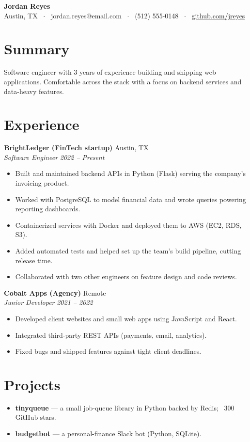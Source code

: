 \documentclass[11pt,letterpaper]{article}
\newcommand{\entry}[4]{\textbf{#1} \hfill #2\\ \textit{#3} \hfill \textit{#4}\par}
\begin{document}
\begin{center}
  {\LARGE \textbf{Jordan Reyes}}\\[2pt]
  Austin, TX \, $\cdot$ \, jordan.reyes@email.com \, $\cdot$ \, (512) 555-0148 \,
  $\cdot$ \, \href{https://github.com/jreyes}{github.com/jreyes}
\end{center}

\section{Summary}
Software engineer with 3 years of experience building and shipping web
applications. Comfortable across the stack with a focus on backend services
and data-heavy features.

\section{Experience}
\entry{BrightLedger (FinTech startup)}{Austin, TX}{Software Engineer}{2022 -- Present}
\begin{itemize}
  \item Built and maintained backend APIs in Python (Flask) serving the company's invoicing product.
  \item Worked with PostgreSQL to model financial data and wrote queries powering reporting dashboards.
  \item Containerized services with Docker and deployed them to AWS (EC2, RDS, S3).
  \item Added automated tests and helped set up the team's build pipeline, cutting release time.
  \item Collaborated with two other engineers on feature design and code reviews.
\end{itemize}

\entry{Cobalt Apps (Agency)}{Remote}{Junior Developer}{2021 -- 2022}
\begin{itemize}
  \item Developed client websites and small web apps using JavaScript and React.
  \item Integrated third-party REST APIs (payments, email, analytics).
  \item Fixed bugs and shipped features against tight client deadlines.
\end{itemize}

\section{Projects}
\begin{itemize}
  \item \textbf{tinyqueue} --- a small job-queue library in Python backed by Redis; ~300 GitHub stars.
  \item \textbf{budgetbot} --- a personal-finance Slack bot (Python, SQLite).
\end{itemize}
\end{document}
